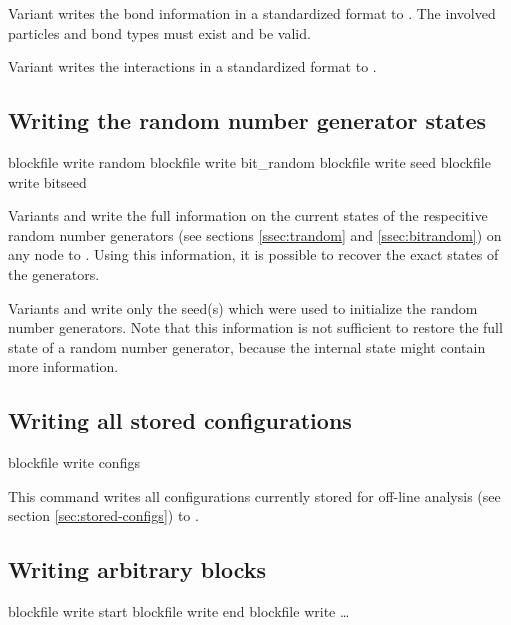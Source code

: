 Variant  writes the bond information in a standardized
format to . The involved particles and bond types must
exist and be valid.

Variant  writes the interactions in a standardized format
to .

\subsection{Writing the random number generator states}
\begin{essyntax}
   blockfile  write random
   blockfile  write bit_random
   blockfile  write seed
   blockfile  write bitseed
\end{essyntax}

Variants  and  write the full information on the
current states of the respecitive random number generators (see
sections \vref{ssec:trandom} and \vref{ssec:bitrandom}) on any node to
.  Using this information, it is possible to recover the
exact states of the generators.

Variants  and  write only the seed(s) which were
used to initialize the random number generators. Note that this
information is not sufficient to restore the full state of a random
number generator, because the internal state might contain more
information.

\subsection{Writing all stored configurations}
\label{sec:blockfile:configs}
\begin{essyntax}
  blockfile  write configs
\end{essyntax}

This command writes all configurations currently stored for off-line
analysis (see section \vref{sec:stored-configs}) to .

\subsection{Writing arbitrary blocks}

\begin{essyntax}
   blockfile  write start 
   blockfile  write end
   blockfile  write  \dots
\end{essyntax}

